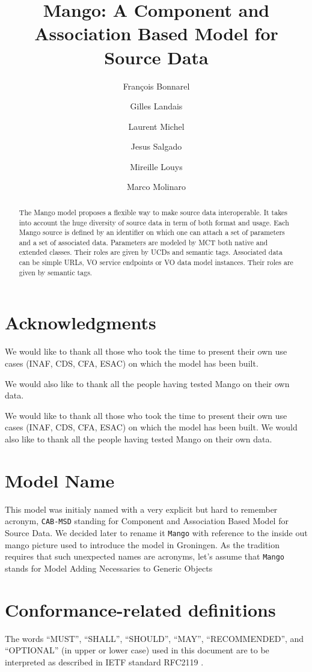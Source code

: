 \documentclass[11pt,a4paper]{ivoa}
\title{Mango: A Component and Association Based Model for Source Data}
\author{François Bonnarel}
\author{Gilles Landais}
\author{Laurent Michel}
\author{Jesus Salgado}
\author{Mireille Louys}
\author{Marco Molinaro}
\begin{document}
\begin{abstract}
The Mango model proposes a flexible way to make source data interoperable. It takes into account the huge diversity of source data in term of both format and usage. 
Each Mango source is defined by an identifier on which  one can attach a set of parameters and a set of associated data. Parameters are modeled by  MCT both native and extended classes. Their roles are given by UCDs and semantic tags.
Associated data can be simple URLs, VO service endpoints or VO data model instances. Their roles are given by semantic tags.



\end{abstract}


\section*{Acknowledgments}

We would like to thank all those who took the time to present their own use cases (INAF, CDS, CFA, ESAC) on which the model has been built.

We would also like to thank all the people having tested Mango on their own data.


We would like to thank all those who took the time to present their own use cases (INAF, CDS, CFA, ESAC) on which the model has been built.
We would also like to thank all the people having tested Mango on their own data.

\section*{Model Name}
This model was initialy named with a very explicit but hard to remember acronym, \texttt{CAB-MSD} standing for Component and Association Based Model for Source Data. We decided later to rename it \texttt{Mango} with reference to the inside out mango picture used to introduce the model in Groningen. As the tradition requires that such unexpected names are acronyms, let's assume that \texttt{Mango} stands for Model Adding Necessaries to Generic Objects


\section*{Conformance-related definitions}

The words ``MUST'', ``SHALL'', ``SHOULD'', ``MAY'', ``RECOMMENDED'', and
``OPTIONAL'' (in upper or lower case) used in this document are to be
interpreted as described in IETF standard RFC2119 \citep{std:RFC2119}.
\end{document}
